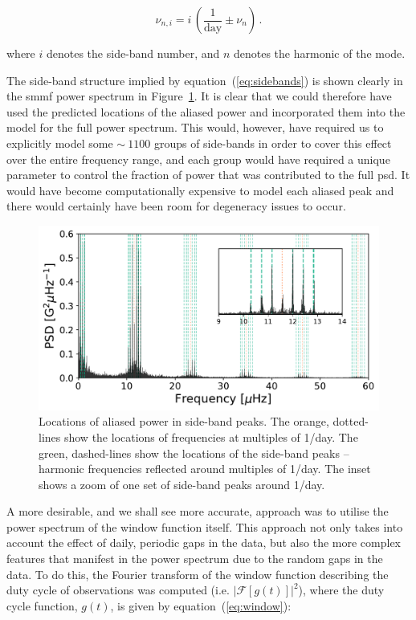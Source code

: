\begin{equation}
\nu_{n, i} = i \, (\frac{1}{\mathrm{day}} \pm \nu_{n}) \, .
\label{eq:sidebands}
\end{equation}

where $i$ denotes the side-band number, and $n$ denotes the harmonic of the mode.

The side-band structure implied by equation~(\ref{eq:sidebands}) is shown clearly in the \gls{smmf} power spectrum in Figure~\ref{fig:sideband_locations}. It is clear that we could therefore have used the predicted locations of the aliased power and incorporated them into the model for the full power spectrum. This would, however, have required us to explicitly model some $\sim~1100$ groups of side-bands in order to cover this effect over the entire frequency range, and each group would have required a unique parameter to control the fraction of power that was contributed to the full \gls{psd}. It would have become computationally expensive to model each aliased peak and there would certainly have been room for degeneracy issues to occur.

\begin{figure}[ht!]
	\centering
	\includegraphics[width=\columnwidth]{sideband.pdf}
	\caption{Locations of aliased power in side-band peaks. The orange, dotted-lines show the locations of frequencies at multiples of 1/day. The green, dashed-lines show the locations of the side-band peaks -- harmonic frequencies reflected around multiples of 1/day.  The inset shows a zoom of one set of side-band peaks around 1/day.}
	\label{fig:sideband_locations}
\end{figure}


A more desirable, and we shall see more accurate, approach was to utilise the power spectrum of the window function itself. This approach not only takes into account the effect of daily, periodic gaps in the data, but also the more complex features that manifest in the power spectrum due to the random gaps in the data. To do this, the Fourier transform of the window function describing the duty cycle of observations was computed (i.e. $\left|\mathcal{F}\left[g(t)\right]\right|^2$), where the duty cycle function, $g(t)$, is given by equation~(\ref{eq:window}):


